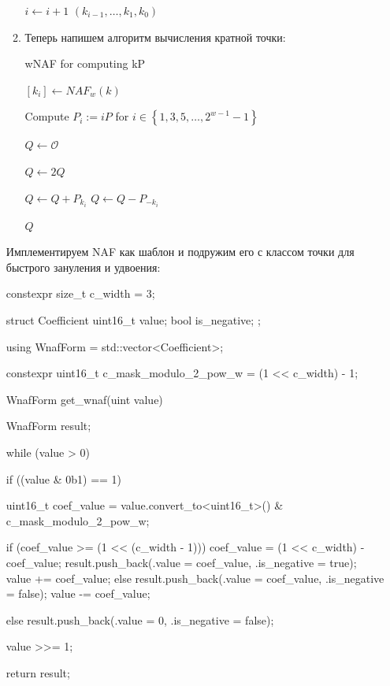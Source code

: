 \begin{itemize}
\begin{enumerate}
\begin{algorithm}[H]
{            $i\gets i+1$
          }
          \Return $(k_{i-1},\dots,k_1,k_0)$
      \end{algorithm}
      \item Теперь напишем алгоритм вычисления кратной точки:

        \begin{algorithm}[H]
        \caption{wNAF for computing kP}
          $[k_i]\gets NAF_w(k)$

          Compute $P_i:=iP$ for $i\in \left\{1,3,5,\dots,2^{w-1}-1\right\}$

          $Q\gets \mathcal{O}$

           {
            $Q\gets 2Q$

             {
               {
                $Q\gets Q + P_{k_i}$
              } {
                $Q\gets Q - P_{-{k_i}}$
              }
            }
          }
          \Return $Q$
      \end{algorithm}
    \end{enumerate}
    Имплементируем NAF как шаблон и подружим его с классом точки для быстрого зануления и удвоения:
    \begin{cppcode}
constexpr size_t c_width = 3;

struct Coefficient {
    uint16_t value;
    bool is_negative;
};

using WnafForm = std::vector<Coefficient>;

constexpr uint16_t c_mask_modulo_2_pow_w = (1 << c_width) - 1;

WnafForm get_wnaf(uint value) {
    WnafForm result;

    while (value > 0) {
        if ((value & 0b1) == 1) {
            uint16_t coef_value = value.convert_to<uint16_t>() & c_mask_modulo_2_pow_w;

            if (coef_value >= (1 << (c_width - 1))) {
                coef_value = (1 << c_width) - coef_value;
                result.push_back({.value = coef_value, .is_negative = true});
                value += coef_value;
            } else {
                result.push_back({.value = coef_value, .is_negative = false});
                value -= coef_value;
            }
        } else {
            result.push_back({.value = 0, .is_negative = false});
        }

        value >>= 1;
    }

    return result;
}


\end{cppcode}
\end{itemize}
